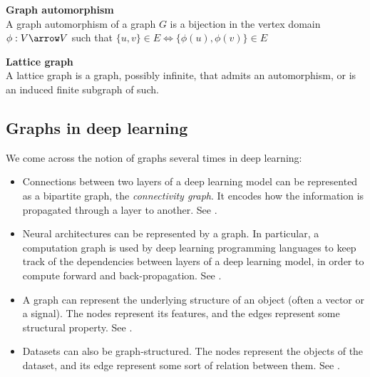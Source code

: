 \begin{definition}\textbf{Graph automorphism}\\
A graph automorphism of a graph $G$ is a bijection in the vertex domain $\phi: V \arrow V$ such that $\{u,v\} \in E \Leftrightarrow \{\phi(u), \phi(v)\} \in E$
\end{definition}

\begin{definition}\textbf{Lattice graph}\\
A lattice graph is a graph, possibly infinite, that admits an automorphism, or is an induced finite subgraph of such.
\end{definition}






\subsection{Graphs in deep learning}

We come across the notion of graphs several times in deep learning:
\begin{itemize}
\item Connections between two layers of a deep learning model can be represented as a bipartite graph, the \emph{connectivity graph}. It encodes how the information is propagated through a layer to another. See .
\item Neural architectures can be represented by a graph. In particular, a computation graph is used by deep learning programming languages to keep track of the dependencies between layers of a deep learning model, in order to compute forward and back-propagation. See .
\item A graph can represent the underlying structure of an object (often a vector or a signal). The nodes represent its features, and the edges represent some structural property. See .
\item Datasets can also be graph-structured. The nodes represent the objects of the dataset, and its edge represent some sort of relation between them. See .
\end{itemize}

